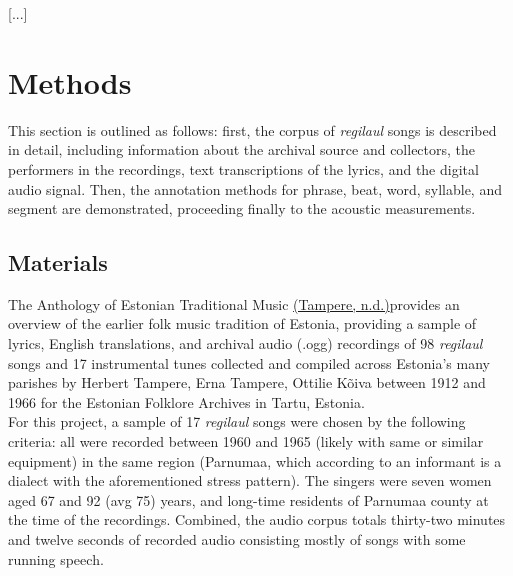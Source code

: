 \documentclass[11pt]{article}
\begin{document}
[...]
\section*{Methods}
This section is outlined as follows: first, the corpus of {\it regilaul} songs is described in detail, including information about the archival source and collectors, the performers in the recordings, text transcriptions of the lyrics, and the digital audio signal. Then, the annotation methods for phrase, beat, word, syllable, and segment are demonstrated, proceeding finally to the acoustic measurements.

\subsection*{Materials}










The Anthology of Estonian Traditional Music \hyperref[csl:1]{(Tampere, n.d.)}provides an overview of the earlier folk music tradition of Estonia, providing a sample of lyrics, English translations, and archival audio (.ogg) recordings of 98 {\it regilaul} songs and 17 instrumental tunes collected and compiled across Estonia's many parishes by Herbert Tampere, Erna Tampere, Ottilie Kõiva between 1912 and 1966 for the Estonian Folklore Archives in Tartu, Estonia. \\

For this project, a sample of 17 {\it regilaul} songs were chosen by the following criteria: all were recorded between 1960 and 1965 (likely with same or similar equipment) in the same region (Parnumaa, which according to an informant is a dialect with the aforementioned stress pattern). The singers were seven women aged 67 and 92 (avg 75) years, and long-time residents of Parnumaa county at the time of the recordings. Combined, the audio corpus totals thirty-two minutes and twelve seconds of recorded audio consisting mostly of songs with some running speech. 
\end{document}
